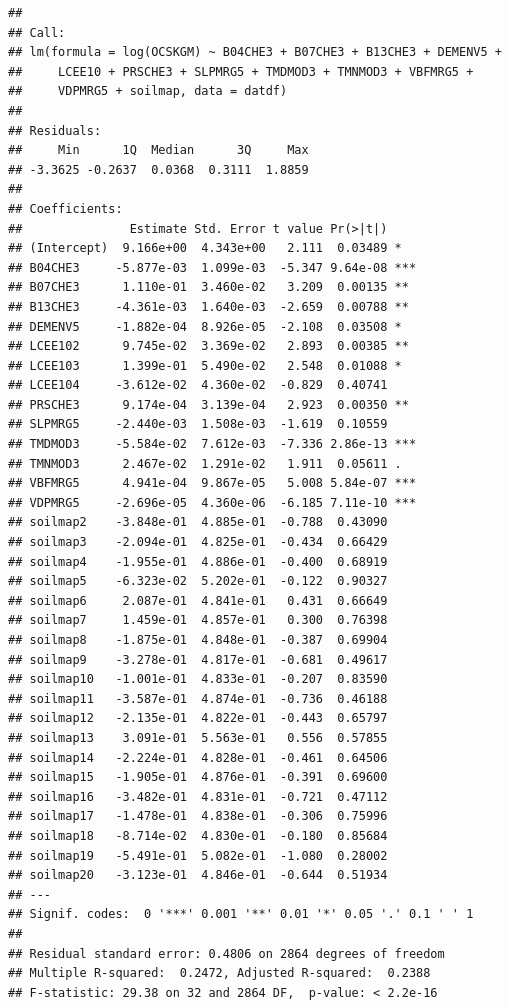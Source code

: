 \documentclass[10pt,b5paper,]{book}
\theoremstyle{definition}
\theoremstyle{definition}
\theoremstyle{definition}
\theoremstyle{remark}
\begin{document}
\begin{verbatim}
## 
## Call:
## lm(formula = log(OCSKGM) ~ B04CHE3 + B07CHE3 + B13CHE3 + DEMENV5 + 
##     LCEE10 + PRSCHE3 + SLPMRG5 + TMDMOD3 + TMNMOD3 + VBFMRG5 + 
##     VDPMRG5 + soilmap, data = datdf)
## 
## Residuals:
##     Min      1Q  Median      3Q     Max 
## -3.3625 -0.2637  0.0368  0.3111  1.8859 
## 
## Coefficients:
##               Estimate Std. Error t value Pr(>|t|)    
## (Intercept)  9.166e+00  4.343e+00   2.111  0.03489 *  
## B04CHE3     -5.877e-03  1.099e-03  -5.347 9.64e-08 ***
## B07CHE3      1.110e-01  3.460e-02   3.209  0.00135 ** 
## B13CHE3     -4.361e-03  1.640e-03  -2.659  0.00788 ** 
## DEMENV5     -1.882e-04  8.926e-05  -2.108  0.03508 *  
## LCEE102      9.745e-02  3.369e-02   2.893  0.00385 ** 
## LCEE103      1.399e-01  5.490e-02   2.548  0.01088 *  
## LCEE104     -3.612e-02  4.360e-02  -0.829  0.40741    
## PRSCHE3      9.174e-04  3.139e-04   2.923  0.00350 ** 
## SLPMRG5     -2.440e-03  1.508e-03  -1.619  0.10559    
## TMDMOD3     -5.584e-02  7.612e-03  -7.336 2.86e-13 ***
## TMNMOD3      2.467e-02  1.291e-02   1.911  0.05611 .  
## VBFMRG5      4.941e-04  9.867e-05   5.008 5.84e-07 ***
## VDPMRG5     -2.696e-05  4.360e-06  -6.185 7.11e-10 ***
## soilmap2    -3.848e-01  4.885e-01  -0.788  0.43090    
## soilmap3    -2.094e-01  4.825e-01  -0.434  0.66429    
## soilmap4    -1.955e-01  4.886e-01  -0.400  0.68919    
## soilmap5    -6.323e-02  5.202e-01  -0.122  0.90327    
## soilmap6     2.087e-01  4.841e-01   0.431  0.66649    
## soilmap7     1.459e-01  4.857e-01   0.300  0.76398    
## soilmap8    -1.875e-01  4.848e-01  -0.387  0.69904    
## soilmap9    -3.278e-01  4.817e-01  -0.681  0.49617    
## soilmap10   -1.001e-01  4.833e-01  -0.207  0.83590    
## soilmap11   -3.587e-01  4.874e-01  -0.736  0.46188    
## soilmap12   -2.135e-01  4.822e-01  -0.443  0.65797    
## soilmap13    3.091e-01  5.563e-01   0.556  0.57855    
## soilmap14   -2.224e-01  4.828e-01  -0.461  0.64506    
## soilmap15   -1.905e-01  4.876e-01  -0.391  0.69600    
## soilmap16   -3.482e-01  4.831e-01  -0.721  0.47112    
## soilmap17   -1.478e-01  4.838e-01  -0.306  0.75996    
## soilmap18   -8.714e-02  4.830e-01  -0.180  0.85684    
## soilmap19   -5.491e-01  5.082e-01  -1.080  0.28002    
## soilmap20   -3.123e-01  4.846e-01  -0.644  0.51934    
## ---
## Signif. codes:  0 '***' 0.001 '**' 0.01 '*' 0.05 '.' 0.1 ' ' 1
## 
## Residual standard error: 0.4806 on 2864 degrees of freedom
## Multiple R-squared:  0.2472, Adjusted R-squared:  0.2388 
## F-statistic: 29.38 on 32 and 2864 DF,  p-value: < 2.2e-16

\end{verbatim}
\end{document}
